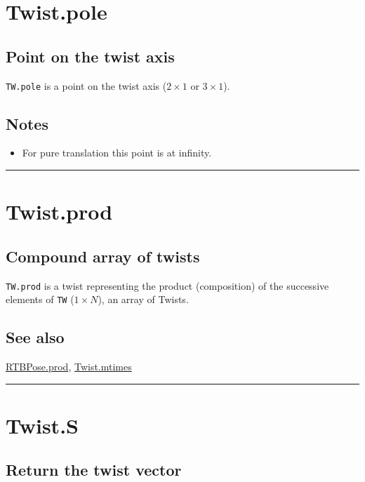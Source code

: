 \hypertarget{Twist.pole}{\section*{Twist.pole}}
\subsection*{Point on the twist axis}


\texttt{TW.pole} is a point on the twist axis ($2 \times 1$ or $3 \times 1$).


\subsection*{Notes}
\begin{itemize}
  \item For pure translation this point is at infinity.
\end{itemize}
\vspace{1.5ex}\hrule

\hypertarget{Twist.prod}{\section*{Twist.prod}}
\subsection*{Compound array of twists}


\texttt{TW.prod} is a twist representing the product (composition) of the
successive elements of \texttt{TW} ($1 \times N$), an array of Twists.


\subsection*{See also}


\hyperlink{RTBPose.prod}{\color{blue} RTBPose.prod}, \hyperlink{Twist.mtimes}{\color{blue} Twist.mtimes}

\vspace{1.5ex}\hrule

\hypertarget{Twist.S}{\section*{Twist.S}}
\subsection*{Return the twist vector}


